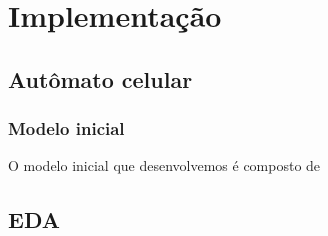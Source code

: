 \chapter{Implementação}

\section{Autômato celular}

\subsection{Modelo inicial}

O modelo inicial que desenvolvemos é composto de 

\section{EDA}